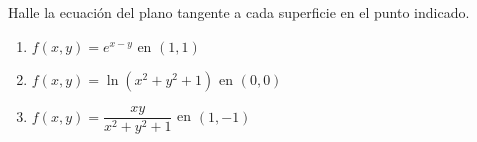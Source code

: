 Halle la ecuación del plano tangente a cada superficie en el punto indicado.
\begin{enumerate}
    \item $f(x,y) = e^{x-y}$ en $(1, 1)$
    \item $f(x,y) = \ln(x^2 + y^2 + 1)$ en $(0, 0)$
    \item $f(x,y) = \dfrac{xy}{x^2 + y^2 + 1}$ en $(1, -1)$
\end{enumerate}
